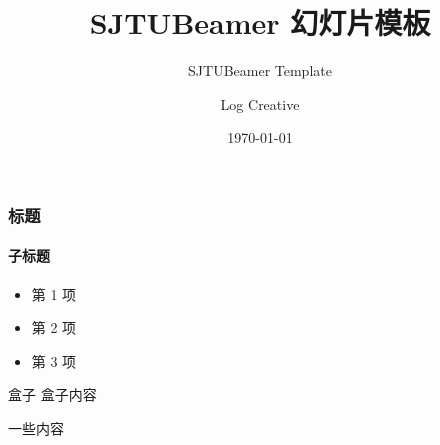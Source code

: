 \documentclass{beamer}
\title{\textsf{SJTUBeamer} 幻灯片模板}
\subtitle{SJTUBeamer Template}
\author{Log Creative}
\institute[]{github.com/LogCreative}
\date{\today}
\begin{document}
    

    \sjtutitle

    \begin{frame}
        \frametitle{标题}
        \framesubtitle{子标题}

        \begin{itemize}
            \item 第 1 项
            \item 第 2 项
            \item 第 3 项
        \end{itemize}

        \begin{block}{盒子}
            盒子内容
        \end{block}
    \end{frame}

    \begin{frame}
        一些内容
    \end{frame}
\end{document}
